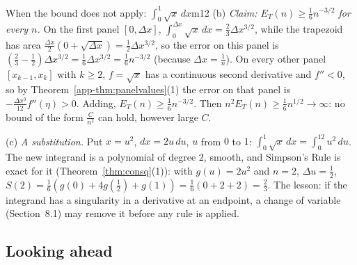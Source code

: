 \documentclass[11pt]{article}
\begin{document}
\begin{exmp}{When the bound does not apply: $\int_0^1\sqrt x\,dx$}{m12}
(b) \emph{Claim: $E_T(n)\ge\frac16n^{-3/2}$ for every $n$.} On the first panel $[0,\Delta x]$, $\int_0^{\Delta x}\sqrt x\,dx=\frac23\Delta x^{3/2}$, while the trapezoid has area $\frac{\Delta x}2\left(0+\sqrt{\Delta x}\right)=\frac12\Delta x^{3/2}$, so the error on this panel is $\left(\frac23-\frac12\right)\Delta x^{3/2}=\frac16\Delta x^{3/2}=\frac16n^{-3/2}$ (because $\Delta x=\frac1n$). On every other panel $[x_{k-1},x_k]$ with $k\ge2$, $f=\sqrt x$ has a continuous second derivative and $f''<0$, so by Theorem~\ref{app-thm:panelvalues}(1) the error on that panel is $-\frac{\Delta x^3}{12}f''(\eta)>0$. Adding, $E_T(n)\ge\frac16n^{-3/2}$. Then $n^2E_T(n)\ge\frac16n^{1/2}\to\infty$: no bound of the form $\frac C{n^2}$ can hold, however large $C$.

(c) \emph{A substitution.} Put $x=u^2$, $dx=2u\,du$, $u$ from $0$ to $1$: $\int_0^1\sqrt x\,dx=\int_0^12u^2\,du$. The new integrand is a polynomial of degree $2$, smooth, and Simpson's Rule is exact for it (Theorem~\ref{thm:consq}(1)): with $g(u)=2u^2$ and $n=2$, $\Delta u=\frac12$, $S(2)=\frac16\left(g(0)+4g\left(\tfrac12\right)+g(1)\right)=\frac16\left(0+2+2\right)=\frac23$. The lesson: if the integrand has a singularity in a derivative at an endpoint, a change of variable (Section~8.1) may remove it before any rule is applied.
\end{exmp}


\subsection*{Looking ahead}
\end{document}
